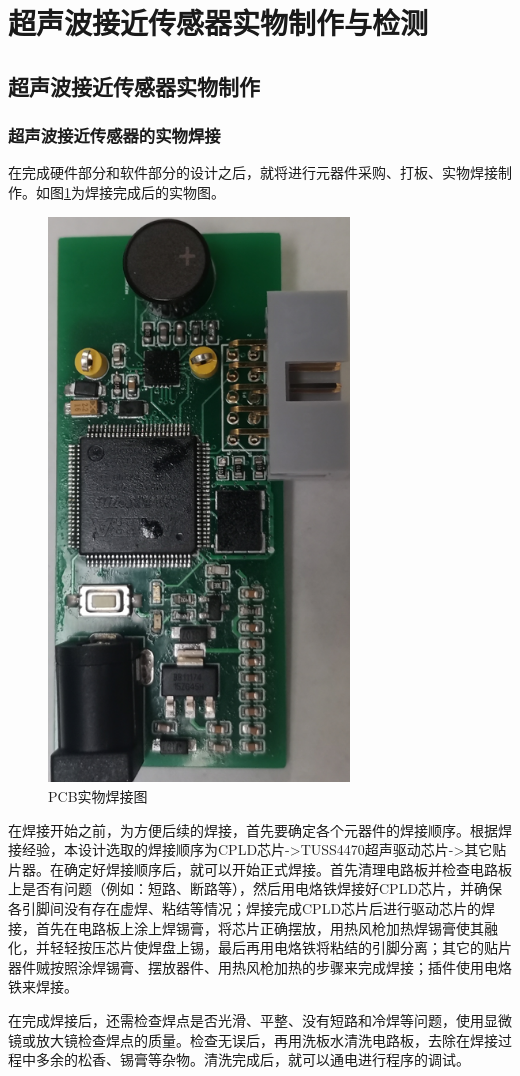 \newpage
\section{超声波接近传感器实物制作与检测}
\subsection{超声波接近传感器实物制作}
\subsubsection{超声波接近传感器的实物焊接}
在完成硬件部分和软件部分的设计之后，就将进行元器件采购、打板、实物焊接制作。如图\ref{PCB实物焊接图}为焊接完成后的实物图。
\begin{figure}[!h]
	\centering
	\includegraphics[width=8cm,angle=-90]{figure/physical map.png}
	\caption{PCB实物焊接图}
	\label{PCB实物焊接图}
\end{figure}\par
在焊接开始之前，为方便后续的焊接，首先要确定各个元器件的焊接顺序。根据焊接经验，本设计选取的焊接顺序为CPLD芯片->TUSS4470超声驱动芯片->其它贴片器。在确定好焊接顺序后，就可以开始正式焊接。首先清理电路板并检查电路板上是否有问题（例如：短路、断路等），然后用电烙铁焊接好CPLD芯片，并确保各引脚间没有存在虚焊、粘结等情况；焊接完成CPLD芯片后进行驱动芯片的焊接，首先在电路板上涂上焊锡膏，将芯片正确摆放，用热风枪加热焊锡膏使其融化，并轻轻按压芯片使焊盘上锡，最后再用电烙铁将粘结的引脚分离；其它的贴片器件贼按照涂焊锡膏、摆放器件、用热风枪加热的步骤来完成焊接；插件使用电烙铁来焊接。\par
在完成焊接后，还需检查焊点是否光滑、平整、没有短路和冷焊等问题，使用显微镜或放大镜检查焊点的质量。检查无误后，再用洗板水清洗电路板，去除在焊接过程中多余的松香、锡膏等杂物。清洗完成后，就可以通电进行程序的调试。

